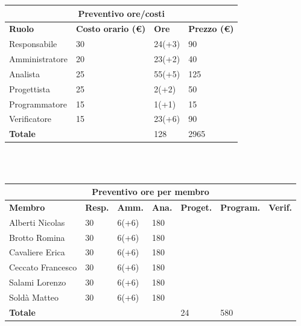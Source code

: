 \documentclass[a4paper, 12pt]{article}
\begin{document}
\begin{center}
	\begin{tabularx}{\textwidth}{|X|X|X|X|}
		\hline
		\multicolumn{4}{|c|}{\textbf{Preventivo ore/costi}}                                      \\
		\hline
		\hline
		\textbf{Ruolo}  & \textbf{Costo orario (\euro)} & \textbf{Ore} & \textbf{Prezzo (\euro)} \\
		\hline
		Responsabile    & 30                            & 24(+3)       & 90                      \\
		\hline
		Amministratore  & 20                            & 23(+2)       & 40                      \\
		\hline
		Analista        & 25                            & 55(+5)       & 125                     \\
		\hline
		Progettista     & 25                            & 2(+2)        & 50                     \\
		\hline
		Programmatore   & 15                            & 1(+1)        & 15                       \\
		\hline
		Verificatore    & 15                            & 23(+6)       & 90                      \\
		\hline
		\hline
		\textbf{Totale} &                               & 128          & 2965                    \\
		\hline
	\end{tabularx}\\[8pt]
	\mbox{}\\
\end{center}

\begin{center}
	\begin{tabularx}{\textwidth}{|X|X|X|X|X|X|X|}
		\hline
		\multicolumn{7}{|c|}{\textbf{Preventivo ore per membro}}                                      \\
		\hline
		\hline
		\textbf{Membro}  & \textbf{Resp.} & \textbf{Amm.} & \textbf{Ana.} &
		\textbf{Proget.} & \textbf{Program.} & \textbf{Verif.} \\
		\hline
		Alberti Nicolas    	& 30 	& 6(+6)       & 180  & &  &                 \\
		\hline
		Brotto Romina    	& 30 	& 6(+6)       & 180  & &  &                 \\
		\hline
		Cavaliere Erica    	& 30 	& 6(+6)       & 180  & &  &                 \\
		\hline
		Ceccato Francesco    	& 30 	& 6(+6)       & 180  & &   &                \\
		\hline
		Salami Lorenzo    	& 30 	& 6(+6)       & 180  & &     &               \\
		\hline
		Soldà Matteo    	& 30 	& 6(+6)       & 180  & &   &                 \\
		\hline
		\hline
		\textbf{Totale} &    & & & 24           & 580      &               \\
		\hline
	\end{tabularx}\\[8pt]
	\mbox{}\\
\end{center}
\end{document}

